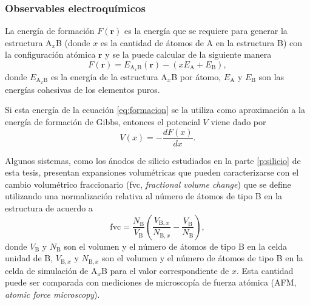 \subsubsection{Observables electroquímicos}\label{ss:electrochim}

La energía de formación $F(\mathbf{r})$ es la energía que se requiere para 
generar la estructura A$_x$B (donde $x$ es la cantidad de átomos de A en la 
estructura B) con la configuración atómica $\mathbf{r}$ y se la puede calcular de
la siguiente manera
\begin{equation}\label{eq:formacion}
    F(\mathbf{r}) = E_{\text{A}_x\text{B}}(\mathbf{r}) - (x E_{\text{A}} + E_{\text{B}}),
\end{equation}
donde $E_{\text{A}_x\text{B}}$ es la energía de la estructura A$_x$B por átomo, 
$E_{\text{A}}$ y $E_{\text{B}}$ son las energías cohesivas de los elementos puros.

Si esta energía de la ecuación \ref{eq:formacion} se la utiliza como aproximación 
a la energía de formación de Gibbs, entonces el potencial $V$ viene dado por
\begin{equation}\label{eq:potencial}
    V(x) = - \frac{d F(x)}{dx}.
\end{equation}

Algunos sistemas, como los ánodos de silicio estudiados en la parte 
\ref{p:silicio} de esta tesis, presentan expansiones volumétricas que pueden 
caracterizarse con el cambio volumétrico fraccionario (fvc, \textit{fractional 
volume change}) que se define utilizando una normalización relativa al número de
átomos de tipo B en la estructura de acuerdo a 
\begin{equation}\label{eq:fvc}
    \text{fvc} = \frac{N_{\text{B}}}{V_{\text{B}}} \left( \frac{V_{\text{B},x}}{N_{\text{B},x}} - \frac{V_{\text{B}}}{N_{\text{B}}} \right),
\end{equation}
donde $V_{\text{B}}$ y $N_{\text{B}}$ son el volumen y el número de átomos de 
tipo B en la celda unidad de B, $V_{\text{B},x}$ y $N_{\text{B},x}$ son el 
volumen y el número de átomos de tipo B en la celda de simulación de A$_x$B para
el valor correspondiente de $x$. Esta cantidad puede ser comparada con mediciones
de microscopía de fuerza atómica (AFM, \textit{atomic force microscopy}).
